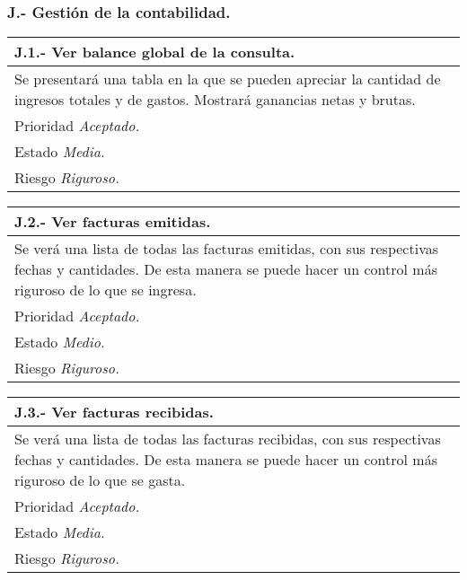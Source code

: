\documentclass[a4paper,oneside,11pt]{book}
\begin{document}
\subsubsection{J.- Gestión de la contabilidad.}

\begin{center}
\begin{tabulary}{15cm}{|L|}
	\hline
		\bf{J.1.- Ver balance global de la consulta.} \\
	\hline
		Se presentará una tabla en la que se pueden apreciar la cantidad de ingresos totales y de gastos. Mostrará ganancias netas y brutas. \\
	\hline
		Prioridad \textit{Aceptado.} \\
	\hline
		Estado \textit{Media.} \\
	\hline
		Riesgo \textit{Riguroso.} \\
	\hline
\end{tabulary}
\end{center}

\begin{center}
\begin{tabulary}{15cm}{|L|}
	\hline
		\bf{J.2.- Ver facturas emitidas.} \\
	\hline
		Se verá una lista de todas las facturas emitidas, con sus respectivas fechas y cantidades. De esta manera se puede hacer un control más riguroso de lo que se ingresa. \\
	\hline
		Prioridad \textit{Aceptado.} \\
	\hline
		Estado \textit{Medio.} \\
	\hline
		Riesgo \textit{Riguroso.} \\
	\hline
\end{tabulary}
\end{center}

\begin{center}
\begin{tabulary}{15cm}{|L|}
	\hline
		\bf{J.3.- Ver facturas recibidas.} \\
	\hline
		Se verá una lista de todas las facturas recibidas, con sus respectivas fechas y cantidades. De esta manera se puede hacer un control más riguroso de lo que se gasta. \\
	\hline
		Prioridad \textit{Aceptado.} \\
	\hline
		Estado \textit{Media.} \\
	\hline
		Riesgo \textit{Riguroso.} \\
	\hline
\end{tabulary}
\end{center}
\end{document}
